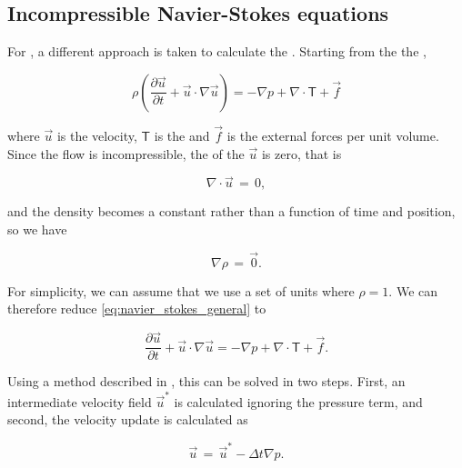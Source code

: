 \subsection{Incompressible Navier-Stokes equations}

For , a different approach is taken to calculate the . Starting from the the ,

\begin{equation} \label{eq:navier_stokes_general}
\rho\left(\frac{\partial\vec{u}}{\partial t} + \vec{u}\cdot\nabla\vec{u}\right) = -\nabla p + \nabla\cdot\boldsymbol{\mathsf{T}} + \vec{f}
\end{equation}

where $\vec{u}$ is the velocity, $\boldsymbol{\mathsf{T}}$ is the  and $\vec{f}$ is the external forces per unit volume. Since the flow is incompressible, the \divergence of the  $\vec{u}$ is zero, that is

\begin{equation} \label{eq:velocity_divergence_incompressible_flow}
\nabla\cdot\vec{u} \,=\, 0,
\end{equation}

and the density becomes a constant rather than a function of time and position, so we have

\begin{equation} \label{eq:density_gradient_incompressible_flow}
\nabla\rho \,=\, \vec{0}.
\end{equation}

For simplicity, we can assume that we use a set of units where $\rho = 1$. We can therefore reduce \eqref{eq:navier_stokes_general} to

\begin{equation} \label{eq:navier_stokes_general_simplified}
\frac{\partial\vec{u}}{\partial t} + \vec{u}\cdot\nabla\vec{u} = -\nabla p + \nabla\cdot\boldsymbol{\mathsf{T}} + \vec{f}.
\end{equation}

Using a method described in \citep{Losasso2004}, this \PDE can be solved in two steps. First, an intermediate velocity field $\vec{u}^*$ is calculated ignoring the pressure term, and second, the velocity update is calculated as

\begin{equation} \label{eq:velocity_update}
\vec{u} \,=\, \vec{u}^* - \Delta t\nabla p.
\end{equation}

